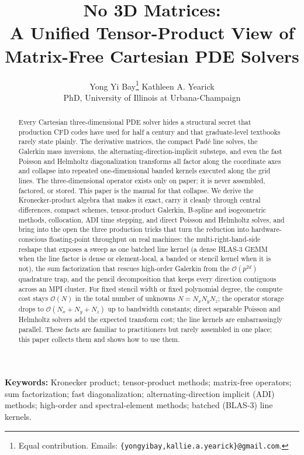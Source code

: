 \documentclass[11pt]{article}
\title{No 3D Matrices:\\
A Unified Tensor-Product View of Matrix-Free Cartesian PDE Solvers}
\author{%
  Yong Yi Bay\thanks{Equal contribution. Emails: \texttt{\{yongyibay,kallie.a.yearick\}@gmail.com}.}
  \hspace{2.5em}
  Kathleen A. Yearick\footnotemark[1] \\
  {\normalfont\normalsize PhD, University of Illinois at Urbana-Champaign}
}
\newcommand{\bigO}{\mathcal{O}}
\newcommand{\Nall}{N}
\begin{document}
\raggedbottom
\maketitle

\begin{abstract}
Every Cartesian three-dimensional PDE solver hides a structural
secret that production CFD codes have used for half a century and
that graduate-level textbooks rarely state plainly.  The derivative
matrices, the compact Pad\'{e} line solves, the Galerkin mass
inversions, the alternating-direction-implicit substeps, and even the
fast Poisson and Helmholtz diagonalization transforms all factor
along the coordinate axes and collapse into repeated one-dimensional
banded kernels executed along the grid lines.  The three-dimensional
operator exists only on paper; it is never assembled, factored, or
stored.  This paper is the manual for that collapse.  We derive the
Kronecker-product algebra that makes it exact, carry it cleanly
through central differences, compact schemes, tensor-product
Galerkin, B-spline and isogeometric methods, collocation, ADI time
stepping, and direct Poisson and Helmholtz solves, and bring into the
open the three production tricks that turn the reduction into
hardware-conscious floating-point throughput on real machines: the
multi-right-hand-side reshape that exposes a sweep as one batched
line kernel (a dense BLAS-3 GEMM when the line factor is dense or
element-local, a banded or stencil kernel when it is not), the sum
factorization that rescues high-order Galerkin from the
$\bigO(p^{2d})$ quadrature trap, and the pencil decomposition that
keeps every direction contiguous across an MPI cluster.  For fixed
stencil width or fixed polynomial degree, the compute cost stays
$\bigO(\Nall)$ in the total number of unknowns
$\Nall = N_x N_y N_z$; the operator storage drops to
$\bigO(N_x + N_y + N_z)$ up to bandwidth constants; direct separable
Poisson and Helmholtz solvers add the expected transform cost; the
line kernels are embarrassingly parallel.  These facts are familiar
to practitioners but rarely assembled in one place; this paper
collects them and shows how to use them.
\end{abstract}

\medskip
\noindent\textbf{Keywords:}
Kronecker product; tensor-product methods; matrix-free operators;
sum factorization; fast diagonalization; alternating-direction implicit
(ADI) methods; high-order and spectral-element methods;
batched (BLAS-3) line kernels.
\end{document}
